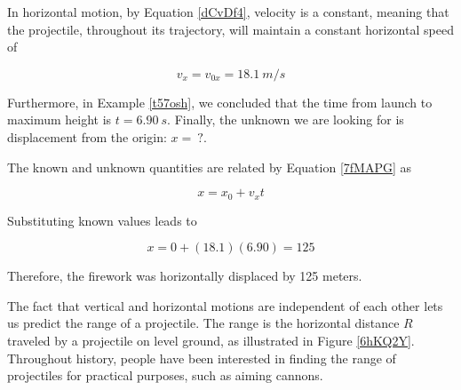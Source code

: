 \documentclass[dvipsnames]{article}
\numberwithin{equation}{section}
\numberwithin{figure}{section}
\begin{document}
In horizontal motion, by Equation \eqref{dCvDf4}, velocity is a constant, meaning that the projectile, throughout its trajectory, will maintain a constant horizontal speed of 

\begin{equation*}
    v_x = v_{0x} = \SI{18.1}{m/s}
\end{equation*}


Furthermore, in Example \ref{t57osh}, we concluded that the time from launch to maximum height is $t = \SI{6.90}{s}$. Finally, the unknown we are looking for is displacement from the origin: $x =\ ?$.

\vspace{1em}

The known and unknown quantities are related by Equation \eqref{7fMAPG} as

\begin{equation*}
    x = x_0 + v_x t
\end{equation*}

Substituting known values leads to 

\begin{equation*}
    x = 0 + (18.1)(6.90) = 125 
\end{equation*}

Therefore, the firework was horizontally displaced by 125 meters.

\solutionEnd


The fact that vertical and horizontal motions are independent of each other lets us predict the range of a projectile. The \gls{range} is the horizontal distance $R$ traveled by a projectile on level ground, as illustrated in Figure \ref{6hKQ2Y}. Throughout history, people have been interested in finding the range of projectiles for practical purposes, such as aiming cannons.
\end{document}
